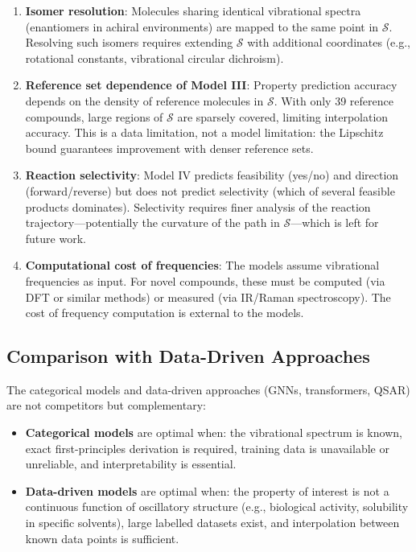 \documentclass[11pt,twocolumn,a4paper]{article}
\theoremstyle{definition}
\theoremstyle{remark}
\newcommand{\Sspace}{\mathcal{S}}
\begin{document}
\begin{enumerate}[nosep]
\item \textbf{Isomer resolution}: Molecules sharing identical vibrational spectra (enantiomers in achiral environments) are mapped to the same point in $\Sspace$. Resolving such isomers requires extending $\Sspace$ with additional coordinates (e.g., rotational constants, vibrational circular dichroism).

\item \textbf{Reference set dependence of Model III}: Property prediction accuracy depends on the density of reference molecules in $\Sspace$. With only 39 reference compounds, large regions of $\Sspace$ are sparsely covered, limiting interpolation accuracy. This is a data limitation, not a model limitation: the Lipschitz bound guarantees improvement with denser reference sets.

\item \textbf{Reaction selectivity}: Model IV predicts feasibility (yes/no) and direction (forward/reverse) but does not predict selectivity (which of several feasible products dominates). Selectivity requires finer analysis of the reaction trajectory---potentially the curvature of the path in $\Sspace$---which is left for future work.

\item \textbf{Computational cost of frequencies}: The models assume vibrational frequencies as input. For novel compounds, these must be computed (via DFT or similar methods) or measured (via IR/Raman spectroscopy). The cost of frequency computation is external to the models.
\end{enumerate}

\subsection{Comparison with Data-Driven Approaches}

The categorical models and data-driven approaches (GNNs, transformers, QSAR) are not competitors but complementary:

\begin{itemize}[nosep]
\item \textbf{Categorical models} are optimal when: the vibrational spectrum is known, exact first-principles derivation is required, training data is unavailable or unreliable, and interpretability is essential.

\item \textbf{Data-driven models} are optimal when: the property of interest is not a continuous function of oscillatory structure (e.g., biological activity, solubility in specific solvents), large labelled datasets exist, and interpolation between known data points is sufficient.
\end{itemize}
\end{document}
